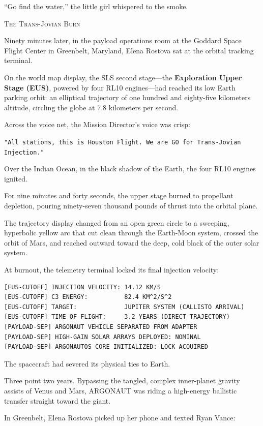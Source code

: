 \documentclass[12pt,twoside,openright]{book}
\newcommand{\sceneheader}[1]{%
  \par\vspace{1.8em}%
  {\noindent\centering\scshape\large #1\par}%
  \vspace{1.0em}%
  \noindent%
}
\newcommand{\dinkus}{%
  \par\vspace{1.2em}%
  {\noindent\centering{\large $\ast\quad\ast\quad\ast$}\par}%
  \vspace{1.2em}%
  \noindent%
}
\begin{document}
``Go find the water,'' the little girl whispered to the smoke.

\dinkus

\sceneheader{The Trans-Jovian Burn}

Ninety minutes later, in the payload operations room at the Goddard
Space Flight Center in Greenbelt, Maryland, Elena Rostova sat at the
orbital tracking terminal.

On the world map display, the SLS second stage---the \textbf{Exploration
Upper Stage (EUS)}, powered by four RL10 engines---had reached its low
Earth parking orbit: an elliptical trajectory of one hundred and
eighty-five kilometers altitude, circling the globe at 7.8 kilometers
per second.

Across the voice net, the Mission Director's voice was crisp:

\passthrough{\lstinline!"All stations, this is Houston Flight. We are GO for Trans-Jovian Injection."!}

Over the Indian Ocean, in the black shadow of the Earth, the four RL10
engines ignited.

For nine minutes and forty seconds, the upper stage burned to propellant
depletion, pouring ninety-seven thousand pounds of thrust into the
orbital plane.

The trajectory display changed from an open green circle to a sweeping,
hyperbolic yellow arc that cut clean through the Earth-Moon system,
crossed the orbit of Mars, and reached outward toward the deep, cold
black of the outer solar system.

At burnout, the telemetry terminal locked its final injection velocity:

\begin{lstlisting}
[EUS-CUTOFF] INJECTION VELOCITY: 14.12 KM/S
[EUS-CUTOFF] C3 ENERGY:          82.4 KM^2/S^2
[EUS-CUTOFF] TARGET:             JUPITER SYSTEM (CALLISTO ARRIVAL)
[EUS-CUTOFF] TIME OF FLIGHT:     3.2 YEARS (DIRECT TRAJECTORY)
[PAYLOAD-SEP] ARGONAUT VEHICLE SEPARATED FROM ADAPTER
[PAYLOAD-SEP] HIGH-GAIN SOLAR ARRAYS DEPLOYED: NOMINAL
[PAYLOAD-SEP] ARGONAUTOS CORE INITIALIZED: LOCK ACQUIRED
\end{lstlisting}

The spacecraft had severed its physical ties to Earth.

Three point two years. Bypassing the tangled, complex inner-planet
gravity assists of Venus and Mars, ARGONAUT was riding a high-energy
ballistic transfer straight toward the giant.

In Greenbelt, Elena Rostova picked up her phone and texted Ryan Vance:
\end{document}
